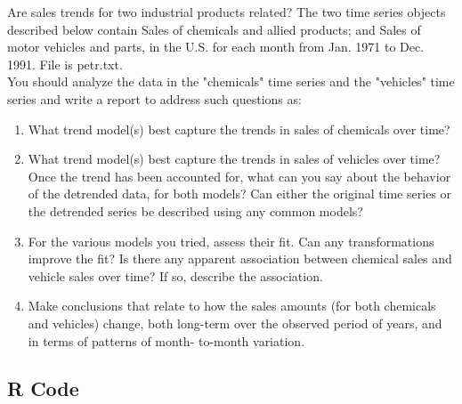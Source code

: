 Are sales trends for two industrial products related? The two time series objects described below contain Sales of chemicals and allied products; and Sales of motor vehicles and parts, in the U.S. for each month from Jan. 1971 to Dec. 1991. File is petr.txt. \\

\noindent You should analyze the data in the "chemicals" time series and the "vehicles" time series and write a report to address such questions as:
\begin{enumerate}[label=(\roman*)]
    \item What trend model(s) best capture the trends in sales of chemicals over time?
    \item What trend model(s) best capture the trends in sales of vehicles over time? Once the trend
has been accounted for, what can you say about the behavior of the detrended data, for both
models? Can either the original time series or the detrended series be described using any
common models?
    \item For the various models you tried, assess their fit. Can any transformations improve the
fit? Is there any apparent association between chemical sales and vehicle sales over time? If so,
describe the association.
    \item Make conclusions that relate to how the sales amounts (for both chemicals and vehicles)
change, both long-term over the observed period of years, and in terms of patterns of month-
to-month variation.
\end{enumerate}

\subsection{R Code}

